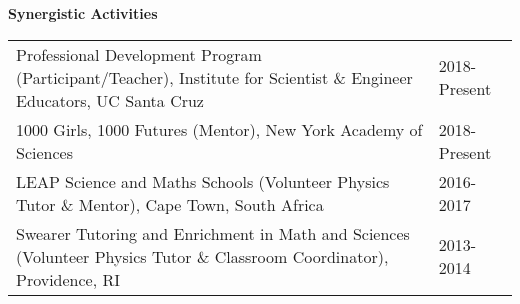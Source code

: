 \documentclass[12pt]{article}
\newcommand{\head}[1]{\vspace{1cm}\textbf{#1}\vspace{0.2cm}\\}
\begin{document}
\head{Synergistic Activities}

{\renewcommand{\arraystretch}{1.5}
\hspace{-0.3cm}\begin{tabularx}{\textwidth}{ht} 

Professional Development Program (Participant/Teacher), Institute for Scientist \& Engineer Educators, UC Santa Cruz & 2018-Present \\ 

1000 Girls, 1000 Futures (Mentor), New York Academy of Sciences & 2018-Present \\ 

LEAP Science and Maths Schools (Volunteer Physics Tutor \& Mentor), Cape Town, South Africa & 2016-2017 \\

Swearer Tutoring and Enrichment in Math and Sciences (Volunteer Physics Tutor \& Classroom Coordinator), Providence, RI & 2013-2014

\end{tabularx}
}
\end{document}
